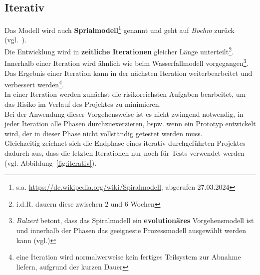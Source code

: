 
\subsection{Iterativ}\label{subsec:iterativ}

Das Modell wird auch \textbf{Sprialmodell}\footnote{
    s.a. \url{https://de.wikipedia.org/wiki/Spiralmodell}, abgerufen 27.03.2024
} genannt und geht auf \textit{Boehm} zurück (vgl.~\cite[]{Boe88}).\\

\noindent
Die Entwicklung wird in \textbf{zeitliche Iterationen} gleicher Länge unterteilt\footnote{
    i.d.R. dauern diese zwischen $2$ und $6$ Wochen
}.\\
Innerhalb einer Iteration wird ähnlich wie beim Wasserfallmodell vorgegangen\footnote{
\textit{Balzert} betont, dass das Spiralmodell ein \textbf{evolutionäres} Vorgehensmodell ist und innerhalb der Phasen das geeigneste Prozessmodell ausgewählt werden kann (vgl.\cite[556]{Bal08})
}.\\
Das Ergebnis einer Iteration kann in der nächsten Iteration weiterbearbeitet und verbessert werden\footnote{
    eine Iteration wird normalwerweise kein fertiges Teilsystem zur Abnahme liefern, aufgrund der kurzen Dauer
}.\\
In einer Iteration werden zunächst die risikoreichsten Aufgaben bearbeitet, um das Risiko im Verlauf des Projektes zu minimieren.\\

\noindent
Bei der Anwendung dieser Vorgehensweise ist es nicht zwingend notwendig, in jeder Iteration alle Phasen  durchzuexerzieren, bspw. wenn ein Prototyp entwickelt wird, der in dieser Phase nicht vollständig getestet werden muss.\\
Gleichzeitig zeichnet sich die Endphase eines iterativ durchgeführten Projektes dadurch aus, dass die letzten Iterationen nur noch für Tests verwendet werden (vgl. Abbildung~\ref{fig:iterativ}).

